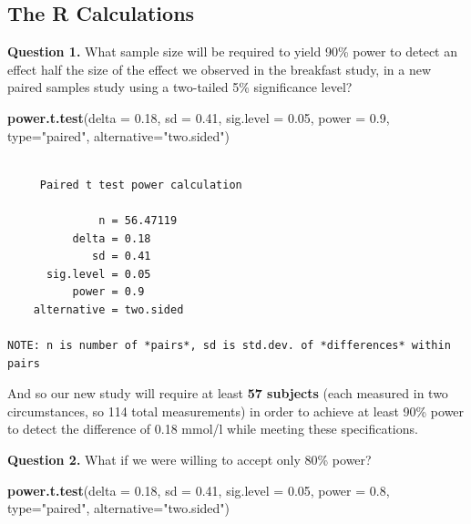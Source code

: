 \documentclass[
]{book}
\newenvironment{Shaded}{\begin{snugshade}}{\end{snugshade}}
\newcommand{\DataTypeTok}[1]{\textcolor[rgb]{0.13,0.29,0.53}{#1}}
\newcommand{\FloatTok}[1]{\textcolor[rgb]{0.00,0.00,0.81}{#1}}
\newcommand{\KeywordTok}[1]{\textcolor[rgb]{0.13,0.29,0.53}{\textbf{#1}}}
\newcommand{\NormalTok}[1]{#1}
\newcommand{\StringTok}[1]{\textcolor[rgb]{0.31,0.60,0.02}{#1}}
\begin{document}
\hypertarget{the-r-calculations}{%
\subsection{The R Calculations}\label{the-r-calculations}}

\textbf{Question 1.} What sample size will be required to yield 90\% power to detect an effect half the size of the effect we observed in the breakfast study, in a new paired samples study using a two-tailed 5\% significance level?

\begin{Shaded}
\begin{Highlighting}[]
\KeywordTok{power.t.test}\NormalTok{(}\DataTypeTok{delta =} \FloatTok{0.18}\NormalTok{, }\DataTypeTok{sd =} \FloatTok{0.41}\NormalTok{, }\DataTypeTok{sig.level =} \FloatTok{0.05}\NormalTok{, }
             \DataTypeTok{power =} \FloatTok{0.9}\NormalTok{, }\DataTypeTok{type=}\StringTok{"paired"}\NormalTok{, }\DataTypeTok{alternative=}\StringTok{"two.sided"}\NormalTok{)}
\end{Highlighting}
\end{Shaded}

\begin{verbatim}

     Paired t test power calculation 

              n = 56.47119
          delta = 0.18
             sd = 0.41
      sig.level = 0.05
          power = 0.9
    alternative = two.sided

NOTE: n is number of *pairs*, sd is std.dev. of *differences* within pairs
\end{verbatim}

And so our new study will require at least \textbf{57 subjects} (each measured in two circumstances, so 114 total measurements) in order to achieve at least 90\% power to detect the difference of 0.18 mmol/l while meeting these specifications.

\textbf{Question 2.} What if we were willing to accept only 80\% power?

\begin{Shaded}
\begin{Highlighting}[]
\KeywordTok{power.t.test}\NormalTok{(}\DataTypeTok{delta =} \FloatTok{0.18}\NormalTok{, }\DataTypeTok{sd =} \FloatTok{0.41}\NormalTok{, }\DataTypeTok{sig.level =} \FloatTok{0.05}\NormalTok{, }
             \DataTypeTok{power =} \FloatTok{0.8}\NormalTok{, }\DataTypeTok{type=}\StringTok{"paired"}\NormalTok{, }\DataTypeTok{alternative=}\StringTok{"two.sided"}\NormalTok{)}
\end{Highlighting}
\end{Shaded}
\end{document}
